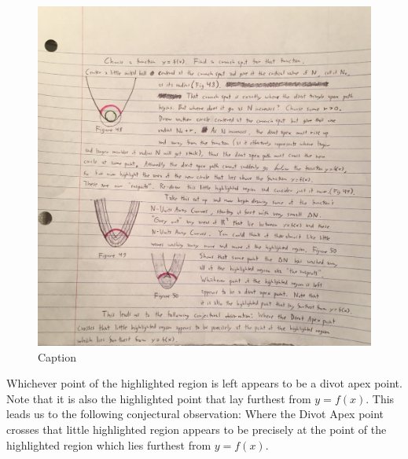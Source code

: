 \begin{figure}
  \includegraphics[width=.9\linewidth]{solving-divot-paths-img/Fig 12-50.png}
  \caption{Caption}
  \label{fig:fig12-50}
\end{figure}

Whichever point of the highlighted region is left appears to be a divot apex point. Note that it is also the highlighted point that lay furthest from $y = f(x)$. This leads us to the following conjectural observation: Where the Divot Apex point crosses that little highlighted region appears to be precisely at the point of the highlighted region which lies furthest from $y = f(x)$.


